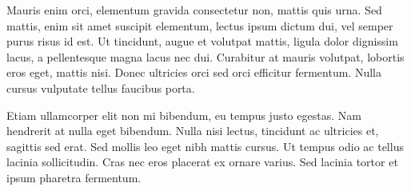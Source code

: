\documentclass{article}
\begin{document}
 Mauris enim orci, elementum gravida consectetur non, mattis quis urna. Sed mattis, enim sit amet suscipit elementum, lectus ipsum dictum dui, vel semper purus risus id est. Ut tincidunt, augue et volutpat mattis, ligula dolor dignissim lacus, a pellentesque magna lacus nec dui. Curabitur at mauris volutpat, lobortis eros eget, mattis nisi. Donec ultricies orci sed orci efficitur fermentum. Nulla cursus vulputate tellus faucibus porta.

Etiam ullamcorper elit non mi bibendum, eu tempus justo egestas. Nam hendrerit at nulla eget bibendum. Nulla nisi lectus, tincidunt ac ultricies et, sagittis sed erat. Sed mollis leo eget nibh mattis cursus. Ut tempus odio ac tellus lacinia sollicitudin. Cras nec eros placerat ex ornare varius. Sed lacinia tortor et ipsum pharetra fermentum. 
\pend

\endnumbering
{}
\end{document}
